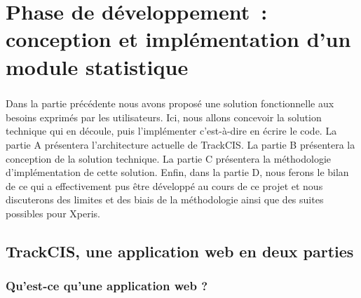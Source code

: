 \chapter{Phase de développement~: conception et implémentation d'un module
statistique}
	\paragraph{}
	Dans la partie précédente nous avons proposé une solution fonctionnelle aux
	besoins exprimés par les utilisateurs. Ici, nous allons concevoir la solution
	technique qui en découle, puis l'implémenter
	c'est-à-dire en écrire le code.
	La partie A présentera l'architecture actuelle de TrackCIS. La partie B
	présentera la conception de la solution technique. La partie C présentera
	la méthodologie d'implémentation de cette solution. Enfin, dans la partie D, nous ferons le
	bilan de ce qui a effectivement pus être développé au cours de ce projet et
	nous discuterons des limites et des biais de la méthodologie ainsi que des
	suites possibles pour Xperis.
	
	\section{TrackCIS, une application web en deux parties}
		
		\subsection{Qu'est-ce qu'une application web ?}
